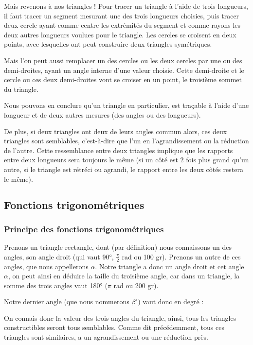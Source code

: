 \documentclass[a4paper]{article}
\begin{document}
			Mais revenons à nos triangles ! 
			Pour tracer un triangle à l'aide de trois longueurs, 
			il faut tracer un segment mesurant une des trois longueurs choisies, 
			puis tracer deux cercle ayant comme centre les extrémités du segment 
			et comme rayons les deux autres longueurs voulues pour le triangle. 
			Les cercles se croisent en deux points, 
			avec lesquelles ont peut construire deux triangles symétriques.

			Mais l'on peut aussi remplacer un des cercles ou les deux 
			cercles par une ou des demi-droites, 
			ayant un angle interne d'une valeur choisie. 
			Cette demi-droite et le cercle ou ces deux demi-droites 
			vont se croiser en un point, le troisième sommet du triangle.

			Nous pouvons en conclure qu'un triangle en particulier, 
			est traçable à l'aide d'une longueur et de deux autres mesures 
			(des angles ou des longueurs).

			De plus, si deux triangles ont deux de leurs angles commun alors, 
			ces deux triangles sont semblables, 
			c'est-à-dire que l'un en l'agrandissement ou la réduction de l'autre.
			Cette ressemblance entre deux triangles implique 
			que les rapports entre deux longueurs sera toujours le même 
			(si un côté est 2 fois plus grand qu'un autre, 
			si le triangle est rétréci ou agrandi, 
			le rapport entre les deux côtés restera le même).
		\subsection{Fonctions trigonométriques}

		\subsubsection{Principe des fonctions trigonométriques}

			Prenons un triangle rectangle, dont (par définition) nous connaissons un des angles, son angle droit (qui vaut 90°, $\frac{\pi}{2}$ rad ou 100 gr). Prenons un autre de ces angles, que nous appellerons $\alpha$. Notre triangle a donc un angle droit et cet angle $\alpha$, on peut ainsi en déduire la taille du troisième angle, car dans un triangle, la somme des trois angles vaut 180° ($\pi$ rad ou 200 gr).

			Notre dernier angle (que nous nommerons $\beta^\circ$) vaut donc en degré : %

			On connais donc la valeur des trois angles du triangle, ainsi, tous les triangles constructibles seront tous semblables. Comme dit précédemment, tous ces triangles sont similaires, a un agrandissement ou une réduction près.
\end{document}
